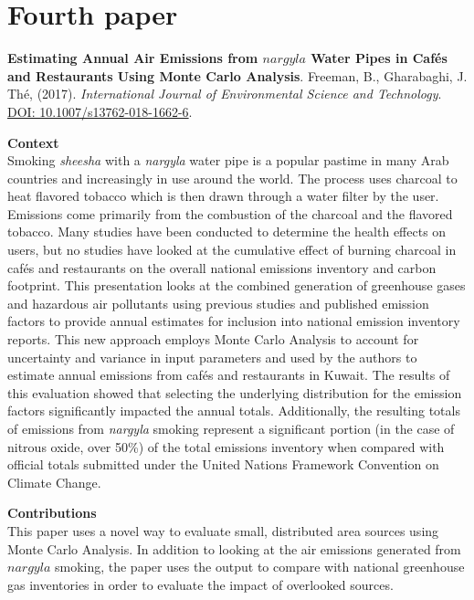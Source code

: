 \section{Fourth paper}
\noindent
\textbf{Estimating Annual Air Emissions from $nargyla$ Water Pipes in Caf\'es and Restaurants Using Monte Carlo Analysis}. Freeman, B., Gharabaghi, J.  Th\'e, (2017). \textit{International Journal of Environmental Science and Technology}. \url{DOI: 10.1007/s13762-018-1662-6}.

\vspace{5mm}
\noindent
\textbf{Context}\\
\noindent
Smoking \textit{sheesha} with a \textit{nargyla} water pipe is a popular pastime in many Arab countries and increasingly in use around the world.  The process uses charcoal to heat flavored tobacco which is then drawn through a water filter by the user.  Emissions come primarily from the combustion of the charcoal and the flavored tobacco.  Many studies have been conducted to determine the health effects on users, but no studies have looked at the cumulative effect of burning charcoal in caf\'es and restaurants on the overall national emissions inventory and carbon footprint.  This presentation looks at the combined generation of greenhouse gases and hazardous air pollutants using previous studies and published emission factors to provide annual estimates for inclusion into national emission inventory reports.  This new approach employs Monte Carlo Analysis to account for uncertainty and variance in input parameters and used by the authors to estimate annual emissions from cafés and restaurants in Kuwait.  The results of this evaluation showed that selecting the underlying distribution for the emission factors significantly impacted the annual totals.  Additionally, the resulting totals of emissions from \textit{nargyla} smoking represent a significant portion (in the case of nitrous oxide, over 50\%) of the total emissions inventory when compared with official totals submitted under the United Nations Framework Convention on Climate Change.

\vspace{5mm}
\noindent
\textbf{Contributions}\\
\noindent
This paper uses a novel way to evaluate small, distributed area sources using Monte Carlo Analysis. In addition to looking at the air emissions generated from $nargyla$ smoking, the paper uses the output to compare with national greenhouse gas inventories in order to evaluate the impact of overlooked sources.

